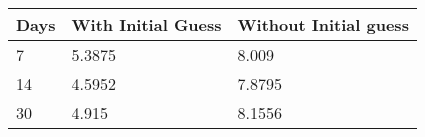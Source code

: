 \begin{tabular}{lll}
Days & With Initial Guess & Without Initial guess \\ 
\hline 
7 & 5.3875 & 8.009 \\ 
14 & 4.5952 & 7.8795 \\ 
30 & 4.915 & 8.1556 \\ 
\hline 
\end{tabular}